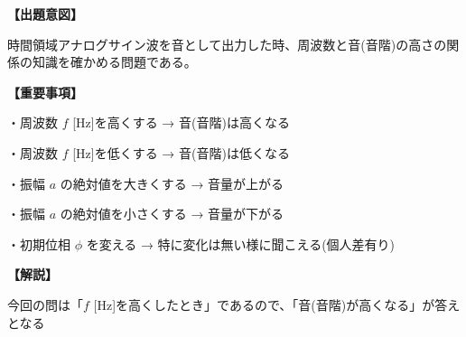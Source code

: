 \noindent \textbf{【出題意図】}

\noindent 時間領域アナログサイン波を音として出力した時、周波数と音(音階)の高さの関係の知識を確かめる問題である。

\vspace{1em}
\noindent \textbf{【重要事項】}

\medskip
\noindent ・周波数 $f$ [Hz]を高くする → 音(音階)は高くなる

\medskip
\noindent ・周波数 $f$ [Hz]を低くする → 音(音階)は低くなる

\medskip
\noindent ・振幅 $a$ の絶対値を大きくする → 音量が上がる

\medskip
\noindent ・振幅 $a$ の絶対値を小さくする → 音量が下がる

\medskip
\noindent ・初期位相 $\phi$ を変える → 特に変化は無い様に聞こえる(個人差有り)

\vspace{1em}
\noindent \textbf{【解説】}

\noindent 今回の問は「$f$ [Hz]を高くしたとき」であるので、「音(音階)が高くなる」が答えとなる

